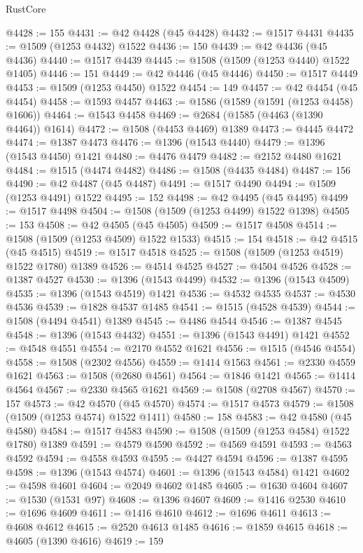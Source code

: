 \begin{lexlean}{RustCore}
\begin{coremodule}
@4428 := 155
@4431 := @42 @4428 (@45 @4428)
@4432 := @1517 @4431
@4435 := @1509 (@1253 @4432) @1522
@4436 := 150
@4439 := @42 @4436 (@45 @4436)
@4440 := @1517 @4439
@4445 := @1508 (@1509 (@1253 @4440) @1522 @1405)
@4446 := 151
@4449 := @42 @4446 (@45 @4446)
@4450 := @1517 @4449
@4453 := @1509 (@1253 @4450) @1522
@4454 := 149
@4457 := @42 @4454 (@45 @4454)
@4458 := @1593 @4457
@4463 := @1586 (@1589 (@1591 (@1253 @4458) @1606))
@4464 := @1543 @4458
@4469 := @2684 (@1585 (@4463 (@1390 @4464)) @1614)
@4472 := @1508 (@4453 @4469) @1389
@4473 := @4445 @4472
@4474 := @1387 @4473
@4476 := @1396 (@1543 @4440)
@4479 := @1396 (@1543 @4450) @1421
@4480 := @4476 @4479
@4482 := @2152 @4480 @1621
@4484 := @1515 (@4474 @4482)
@4486 := @1508 (@4435 @4484)
@4487 := 156
@4490 := @42 @4487 (@45 @4487)
@4491 := @1517 @4490
@4494 := @1509 (@1253 @4491) @1522
@4495 := 152
@4498 := @42 @4495 (@45 @4495)
@4499 := @1517 @4498
@4504 := @1508 (@1509 (@1253 @4499) @1522 @1398)
@4505 := 153
@4508 := @42 @4505 (@45 @4505)
@4509 := @1517 @4508
@4514 := @1508 (@1509 (@1253 @4509) @1522 @1533)
@4515 := 154
@4518 := @42 @4515 (@45 @4515)
@4519 := @1517 @4518
@4525 := @1508 (@1509 (@1253 @4519) @1522 @1780) @1389
@4526 := @4514 @4525
@4527 := @4504 @4526
@4528 := @1387 @4527
@4530 := @1396 (@1543 @4499)
@4532 := @1396 (@1543 @4509)
@4535 := @1396 (@1543 @4519) @1421
@4536 := @4532 @4535
@4537 := @4530 @4536
@4539 := @1828 @4537 @1485
@4541 := @1515 (@4528 @4539)
@4544 := @1508 (@4494 @4541) @1389
@4545 := @4486 @4544
@4546 := @1387 @4545
@4548 := @1396 (@1543 @4432)
@4551 := @1396 (@1543 @4491) @1421
@4552 := @4548 @4551
@4554 := @2170 @4552 @1621
@4556 := @1515 (@4546 @4554)
@4558 := @1508 (@2302 @4556)
@4559 := @1414 @1563
@4561 := @2330 @4559 @1621
@4563 := @1508 (@2680 @4561)
@4564 := @1846 @1421
@4565 := @1414 @4564
@4567 := @2330 @4565 @1621
@4569 := @1508 (@2708 @4567)
@4570 := 157
@4573 := @42 @4570 (@45 @4570)
@4574 := @1517 @4573
@4579 := @1508 (@1509 (@1253 @4574) @1522 @1411)
@4580 := 158
@4583 := @42 @4580 (@45 @4580)
@4584 := @1517 @4583
@4590 := @1508 (@1509 (@1253 @4584) @1522 @1780) @1389
@4591 := @4579 @4590
@4592 := @4569 @4591
@4593 := @4563 @4592
@4594 := @4558 @4593
@4595 := @4427 @4594
@4596 := @1387 @4595
@4598 := @1396 (@1543 @4574)
@4601 := @1396 (@1543 @4584) @1421
@4602 := @4598 @4601
@4604 := @2049 @4602 @1485
@4605 := @1630 @4604
@4607 := @1530 (@1531 @97)
@4608 := @1396 @4607
@4609 := @1416 @2530
@4610 := @1696 @4609
@4611 := @1416 @4610
@4612 := @1696 @4611
@4613 := @4608 @4612
@4615 := @2520 @4613 @1485
@4616 := @1859 @4615
@4618 := @4605 (@1390 @4616)
@4619 := 159

\end{coremodule}
\end{lexlean}
